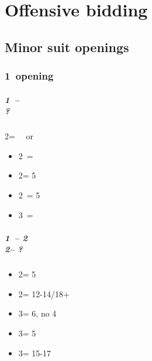 \documentclass[12pt, a4paper]{report}
\begin{document}
\part*{\colorbox{RoyalPurple!30}{Offensive bidding}}
 {

    \chapter*{\colorbox{Plum!30}{Minor suit openings}}
     {

        \section*{\colorbox{blue!30}{1\clubs\ opening}}
         {

            \subsubsection*{1\clubs\ -- \alrts{2\clubs} \\ ?}
            2\clubs = \gf\ \nat\ or \bal
            \begin{itemize}
                \item 2\diams\ = \bal
                \item 2\major = 5\major
                \item 2\nt\ = 5\diams
                \item 3\clubs\ = \clubs
            \end{itemize}

            \subsubsection*{1\clubs\ -- 2\clubs \\
                        2\diams -- ?}
            \begin{itemize}
                \item 2\major = 5\major
                \item 2\nt = 12-14/18+ \bal
                \item 3\clubs = 6\clubs, no 4\major
                \item 3\diams = 5\diams
                \item 3\nt = 15-17 \bal
            \end{itemize}
        }

}}
\end{document}
